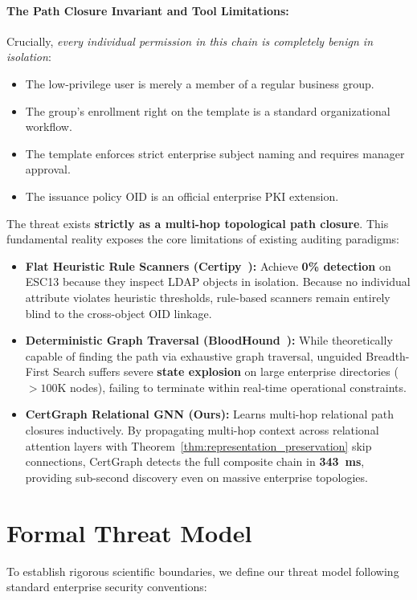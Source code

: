 \paragraph{The Path Closure Invariant and Tool Limitations:}
Crucially, \textit{every individual permission in this chain is completely benign in isolation}:
\begin{itemize}
    \item The low-privilege user is merely a member of a regular business group.
    \item The group's enrollment right on the template is a standard organizational workflow.
    \item The template enforces strict enterprise subject naming and requires manager approval.
    \item The issuance policy OID is an official enterprise PKI extension.
\end{itemize}
The threat exists \textbf{strictly as a multi-hop topological path closure}. This fundamental reality exposes the core limitations of existing auditing paradigms:
\begin{itemize}
    \item \textbf{Flat Heuristic Rule Scanners (Certipy~\cite{lyak2021certipy}):} Achieve \textbf{0\% detection} on ESC13 because they inspect LDAP objects in isolation. Because no individual attribute violates heuristic thresholds, rule-based scanners remain entirely blind to the cross-object OID linkage.
    \item \textbf{Deterministic Graph Traversal (BloodHound~\cite{specterops2023bloodhound}):} While theoretically capable of finding the path via exhaustive graph traversal, unguided Breadth-First Search suffers severe \textbf{state explosion} on large enterprise directories ($>100\text{K}$ nodes), failing to terminate within real-time operational constraints.
    \item \textbf{CertGraph Relational GNN (Ours):} Learns multi-hop relational path closures inductively. By propagating multi-hop context across relational attention layers with Theorem~\ref{thm:representation_preservation} skip connections, CertGraph detects the full composite chain in \textbf{343~ms}, providing sub-second discovery even on massive enterprise topologies.
\end{itemize}

\section{Formal Threat Model}
To establish rigorous scientific boundaries, we define our threat model following standard enterprise security conventions:

